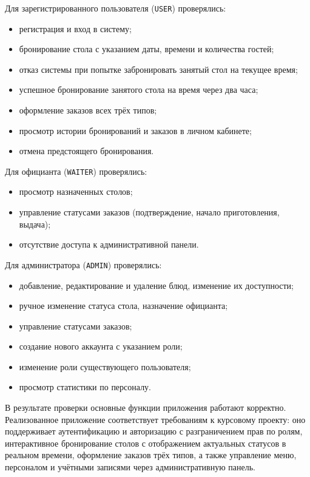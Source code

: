 Для зарегистрированного пользователя (\texttt{USER}) проверялись:
\begin{itemize}
  \item регистрация и вход в систему;
  \item бронирование стола с указанием даты, времени и количества
        гостей;
  \item отказ системы при попытке забронировать занятый стол на
        текущее время;
  \item успешное бронирование занятого стола на время через два часа;
  \item оформление заказов всех трёх типов;
  \item просмотр истории бронирований и заказов в личном кабинете;
  \item отмена предстоящего бронирования.
\end{itemize}

Для официанта (\texttt{WAITER}) проверялись:
\begin{itemize}
  \item просмотр назначенных столов;
  \item управление статусами заказов (подтверждение, начало
        приготовления, выдача);
  \item отсутствие доступа к административной панели.
\end{itemize}

Для администратора (\texttt{ADMIN}) проверялись:
\begin{itemize}
  \item добавление, редактирование и удаление блюд, изменение их
        доступности;
  \item ручное изменение статуса стола, назначение официанта;
  \item управление статусами заказов;
  \item создание нового аккаунта с указанием роли;
  \item изменение роли существующего пользователя;
  \item просмотр статистики по персоналу.
\end{itemize}

В результате проверки основные функции приложения работают корректно.
Реализованное приложение соответствует требованиям к курсовому
проекту: оно поддерживает аутентификацию и авторизацию с
разграничением прав по ролям, интерактивное бронирование столов с
отображением актуальных статусов в реальном времени, оформление
заказов трёх типов, а также управление меню, персоналом и учётными
записями через административную панель.

